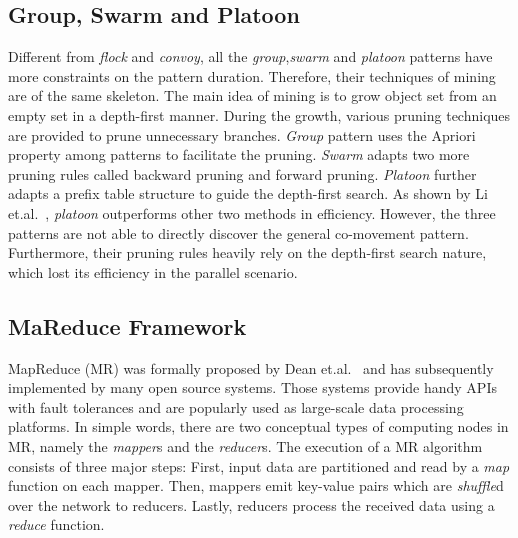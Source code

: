 \subsection{Group, Swarm and Platoon}
Different from \emph{flock} and \emph{convoy}, all the \emph{group},\emph{swarm} and \emph{platoon}
patterns have more constraints on the pattern duration. Therefore, their techniques of mining are of
the same skeleton. The main idea of mining is to grow object set from an empty set
in a depth-first manner. During the growth, various pruning techniques are provided to prune 
unnecessary branches. \emph{Group} pattern uses the Apriori property among patterns to facilitate the pruning.
\emph{Swarm} adapts two more pruning rules called backward pruning and forward pruning. \emph{Platoon}
further adapts a prefix table structure to guide the depth-first search. As shown by Li et.al.~\cite{li2015platoon},
\emph{platoon} outperforms other two methods in efficiency. 
However, the three patterns are not able to directly discover the general co-movement pattern.
Furthermore, their pruning rules heavily rely on the depth-first search nature, which lost its efficiency
in the parallel scenario.


\subsection{MaReduce Framework}
MapReduce (MR) was formally proposed by Dean et.al.~\cite{dean2008mapreduce}
and has subsequently implemented by many open source systems. Those systems
provide handy APIs with fault tolerances and are popularly
used as large-scale data processing platforms. 
In simple words, there are two conceptual types of computing nodes in MR,
namely the \emph{mapper}s and the \emph{reducer}s. The execution of a MR 
algorithm consists of three major steps: First, input data
are partitioned and read by a \emph{map} function on each mapper. Then, mappers
emit key-value pairs which are \emph{shuffle}d over the network to reducers. Lastly,
reducers process the received data using a \emph{reduce} function. 

